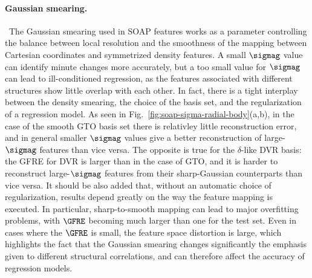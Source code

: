 \paragraph*{Gaussian smearing.}\,
The Gaussian smearing used in SOAP features works as a parameter controlling the balance between local resolution and the smoothness of the mapping between Cartesian coordinates and symmetrized density features. A small $\sigmag$ value can identify minute changes more accurately, but a too small value for $\sigmag$ can lead to ill-conditioned regression, as the features associated with different structures show little overlap with each other.
In fact, there is a tight interplay between the density smearing, the choice of the basis set, and the regularization of a regression model. 
As seen in Fig.~\ref{fig:soap-sigma-radial-body}(a,b), in the case of the smooth GTO basis set there is relativley little reconstruction error, and in general smaller $\sigmag$ values give a better reconstruction of large-$\sigmag$ features than vice versa. The opposite is true for the $\delta$-like DVR basis: the GFRE for DVR is larger than in the case of GTO, and it is harder to reconstruct large-$\sigmag$ features from their sharp-Gaussian counterparts than vice versa. It should be also added that, without an automatic choice of regularization, results depend greatly on the way the feature mapping is executed. In particular, sharp-to-smooth mapping can lead to major overfitting problems, with $\GFRE$ becoming much larger than one for the test set.  
Even in cases where the $\GFRE$ is small, the feature space distortion is large, which highlights the fact that the Gaussian smearing changes significantly the emphasis given to different structural correlations, and can therefore affect the accuracy of regression models. 

